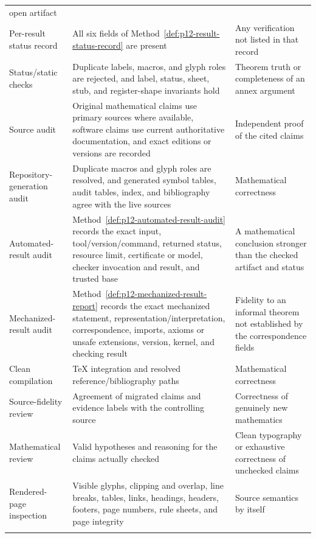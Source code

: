 \begin{landscape}
\begin{longtable}{@{}p{1.40in}p{2.35in}p{3.35in}@{}}
open artifact \\ \addlinespace
Per-result status record & All six fields of
Method~\ref{def:p12-result-status-record} are present & Any verification not
listed in that record \\ \addlinespace
Status/static checks & Duplicate labels, macros, and glyph roles are rejected,
and label, status, sheet, stub, and register-shape invariants hold & Theorem
truth or completeness of an annex argument \\ \addlinespace
Source audit & Original mathematical claims use primary sources where
available, software claims use current authoritative documentation, and exact
editions or versions are recorded & Independent proof of the cited claims \\
\addlinespace
Repository-generation audit & Duplicate macros and glyph roles are resolved,
and generated symbol tables, audit tables, index, and bibliography agree with
the live sources & Mathematical correctness \\ \addlinespace
Automated-result audit & Method~\ref{def:p12-automated-result-audit} records
the exact input, tool/version/command, returned status, resource limit,
certificate or model, checker invocation and result, and trusted base & A
mathematical conclusion stronger than the checked artifact and status \\
\addlinespace
Mechanized-result audit & Method~\ref{def:p12-mechanized-result-report} records
the exact mechanized statement, representation/interpretation, correspondence,
imports, axioms or unsafe extensions, version, kernel, and checking result &
Fidelity to an informal theorem not established by the correspondence fields \\
\addlinespace
Clean compilation & TeX integration and resolved reference/bibliography paths &
Mathematical correctness \\ \addlinespace
Source-fidelity review & Agreement of migrated claims and evidence labels with
the controlling source & Correctness of genuinely new mathematics \\ \addlinespace
Mathematical review & Valid hypotheses and reasoning for the claims actually
checked & Clean typography or exhaustive correctness of unchecked claims \\
\addlinespace
Rendered-page inspection & Visible glyphs, clipping and overlap, line breaks,
tables, links, headings, headers, footers, page numbers, rule sheets, and page
integrity & Source semantics by itself \\ \addlinespace

\end{longtable}
\end{landscape}

